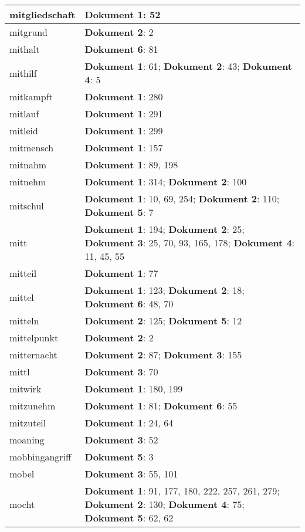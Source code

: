 \documentclass[a5paper]{article}
\begin{document}
\begin{longtable}[l]{|l|p{3in}|}
\hline
mitgliedschaft & \textbf{Dokument 1}: 52 \\
\hline
mitgrund & \textbf{Dokument 2}: 2 \\
\hline
mithalt & \textbf{Dokument 6}: 81 \\
\hline
mithilf & \textbf{Dokument 1}: 61; \textbf{Dokument 2}: 43; \textbf{Dokument 4}: 5 \\
\hline
mitkampft & \textbf{Dokument 1}: 280 \\
\hline
mitlauf & \textbf{Dokument 1}: 291 \\
\hline
mitleid & \textbf{Dokument 1}: 299 \\
\hline
mitmensch & \textbf{Dokument 1}: 157 \\
\hline
mitnahm & \textbf{Dokument 1}: 89, 198 \\
\hline
mitnehm & \textbf{Dokument 1}: 314; \textbf{Dokument 2}: 100 \\
\hline
mitschul & \textbf{Dokument 1}: 10, 69, 254; \textbf{Dokument 2}: 110; \textbf{Dokument 5}: 7 \\
\hline
mitt & \textbf{Dokument 1}: 194; \textbf{Dokument 2}: 25; \textbf{Dokument 3}: 25, 70, 93, 165, 178; \textbf{Dokument 4}: 11, 45, 55 \\
\hline
mitteil & \textbf{Dokument 1}: 77 \\
\hline
mittel & \textbf{Dokument 1}: 123; \textbf{Dokument 2}: 18; \textbf{Dokument 6}: 48, 70 \\
\hline
mitteln & \textbf{Dokument 2}: 125; \textbf{Dokument 5}: 12 \\
\hline
mittelpunkt & \textbf{Dokument 2}: 2 \\
\hline
mitternacht & \textbf{Dokument 2}: 87; \textbf{Dokument 3}: 155 \\
\hline
mittl & \textbf{Dokument 3}: 70 \\
\hline
mitwirk & \textbf{Dokument 1}: 180, 199 \\
\hline
mitzunehm & \textbf{Dokument 1}: 81; \textbf{Dokument 6}: 55 \\
\hline
mitzuteil & \textbf{Dokument 1}: 24, 64 \\
\hline
moaning & \textbf{Dokument 3}: 52 \\
\hline
mobbingangriff & \textbf{Dokument 5}: 3 \\
\hline
mobel & \textbf{Dokument 3}: 55, 101 \\
\hline
mocht & \textbf{Dokument 1}: 91, 177, 180, 222, 257, 261, 279; \textbf{Dokument 2}: 130; \textbf{Dokument 4}: 75; \textbf{Dokument 5}: 62, 62 \\

\end{longtable}
\end{document}
